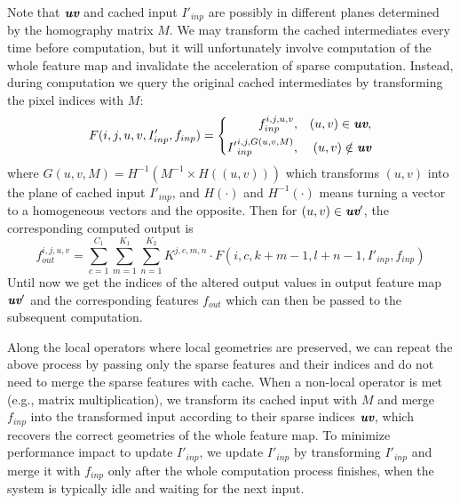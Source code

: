 Note that $\textit{\textbf{uv}}$ and cached input $I'_{inp}$ are possibly in different planes determined by the homography matrix $M$.
We may transform the cached intermediates every time before computation, but it will unfortunately involve computation of the whole feature map and invalidate the acceleration of sparse computation.
Instead, during computation we query the original cached intermediates by transforming the pixel indices with $M$:
\begin{equation}
    F(i,j,u,v, I'_{inp}, f_{inp}) = \left\{
        \begin{aligned}
            f_{inp}^{i,j,u,v}  & , & (u,v) \in \textit{\textbf{uv}}, \\
            {I'}_{inp}^{i,j,G(u,v,M)} &, & (u,v) \notin \textit{\textbf{uv}}
        \end{aligned}
        \right. 
    \label{eq:query}
\end{equation}
where $G(u,v,M) = H^{-1}(M^{-1}\times H((u,v)))$ which transforms $(u,v)$ into the plane of cached input $I'_{inp}$, and $H(\cdot)$ and $H^{-1}(\cdot)$ means turning a vector to a homogeneous vectors and the opposite.
Then for $(u,v)\in\textit{\textbf{uv}}'$, the corresponding computed output is
\begin{equation}
    f_{out}^{i,j,u,v} = \sum_{c=1}^{C_1} \sum_{m=1}^{K_1} \sum_{n=1}^{K_2} K^{j,c,m,n}\cdot F(i,c,k+m-1,l+n-1, I'_{inp}, f_{inp})
\end{equation}
Until now we get the indices of the altered output values in output feature map $\textit{\textbf{uv}}'$ and the corresponding features $f_{out}$ which can then be passed to the subsequent computation.

Along the local operators where local geometries are preserved, we can repeat the above process by passing only the sparse features and their indices and do not need to merge the sparse features with cache.
When a non-local operator is met (e.g., matrix multiplication), we transform its cached input with $M$ and merge $f_{inp}$ into the transformed input according to their sparse indices $\textit{\textbf{uv}}$, which recovers the correct geometries of the whole feature map.
To minimize performance impact to update $I'_{inp}$, we update $I'_{inp}$ by transforming $I'_{inp}$ and merge it with $f_{inp}$ only after the whole computation process finishes, when the system is typically idle and waiting for the next input.

